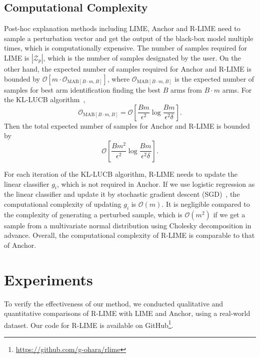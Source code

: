 \documentclass[runningheads]{llncs}
\begin{document}

\subsection{Computational Complexity}\label{subsec:complexity}
Post-hoc explanation methods including LIME, Anchor and R-LIME
need to sample a perturbation vector
and get the output of the black-box model multiple times,
which is computationally expensive.
The number of samples required for LIME is $|\mathcal{Z}_p|$,
which is the number of samples designated by the user.
On the other hand,
the expected number of samples required for Anchor and R-LIME is bounded by
$\mathcal{O}[m\cdot\mathcal{O}_{\mathrm{MAB}[B\cdot m,B]}]$,
where $\mathcal{O}_{\mathrm{MAB}[B\cdot m,B]}$
is the expected number of samples
for best arm identification finding the best $B$ arms from $B\cdot m$ arms.
For the KL-LUCB algorithm~\cite{kaufmann2013information},
\begin{equation}
  \mathcal{O}_{\mathrm{MAB}[B\cdot m,B]}=
  \mathcal{O}\left[\frac{Bm}{\epsilon^2}\log\frac{Bm}{\epsilon^2\delta}\right].
\end{equation}
Then the total expected number of samples for Anchor and R-LIME is bounded by
\begin{equation}
  \mathcal{O}\left[\frac{Bm^2}{\epsilon^2}\log\frac{Bm}{\epsilon^2\delta}\right].
\end{equation}

For each iteration of the KL-LUCB algorithm, R-LIME needs to update
the linear classifier $g_i$, which is not required in Anchor.
If we use logistic regression as the linear classifier and update it
by stochastic gradient descent (SGD)~\cite{robbins1951stochastic},
the computational complexity of updating $g_i$ is $\mathcal{O}(m)$.
It is negligible compared to the complexity of generating a perturbed sample,
which is $\mathcal{O}(m^2)$ if we get a sample
from a multivariate normal distribution using Cholesky decomposition in advance.
Overall, the computational complexity of R-LIME is comparable to that of Anchor.

\section{Experiments}
To verify the effectiveness of our method,
we conducted qualitative and quantitative comparisons of R-LIME
with LIME and Anchor, using a real-world dataset.
Our code for R-LIME is available on GitHub\footnote{\url{https://github.com/g-ohara/rlime}}.
\end{document}
